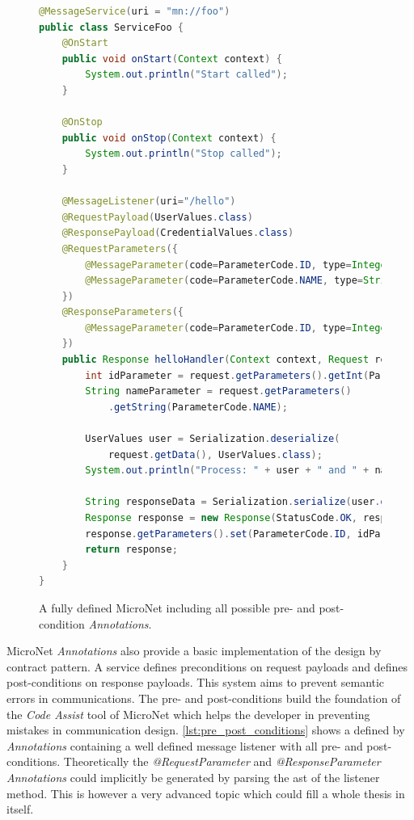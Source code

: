 \begin{figure}
\begin{lstlisting}[language=Java,firstnumber=1] 
@MessageService(uri = "mn://foo")
public class ServiceFoo {
	@OnStart
	public void onStart(Context context) {
		System.out.println("Start called");
	}
	
	@OnStop
	public void onStop(Context context) {
		System.out.println("Stop called");
	}
	
	@MessageListener(uri="/hello")
	@RequestPayload(UserValues.class) 
	@ResponsePayload(CredentialValues.class)
	@RequestParameters({
		@MessageParameter(code=ParameterCode.ID, type=Integer.class),
		@MessageParameter(code=ParameterCode.NAME, type=String.class)
	})
	@ResponseParameters({
		@MessageParameter(code=ParameterCode.ID, type=Integer.class),
	})
	public Response helloHandler(Context context, Request request) {
		int idParameter = request.getParameters().getInt(ParameterCode.ID);
		String nameParameter = request.getParameters()
			.getString(ParameterCode.NAME);
		
		UserValues user = Serialization.deserialize(
			request.getData(), UserValues.class);
		System.out.println("Process: " + user + " and " + nameParameter);

		String responseData = Serialization.serialize(user.getCredentials());
		Response response = new Response(StatusCode.OK, responseData);
		response.getParameters().set(ParameterCode.ID, idParameter);
		return response;
	}
}
\end{lstlisting}
\caption{A fully defined MicroNet \ms{} including all possible pre- and
post-condition \textit{Annotations}.}
\label{lst:pre_post_conditions}
\end{figure}

MicroNet \textit{Annotations} also provide a basic implementation of the design
by contract pattern. A service defines preconditions on request payloads and
defines post-conditions on response payloads. This system aims to prevent
semantic errors in communications. The pre- and post-conditions build the
foundation of the \textit{Code Assist} tool of MicroNet which helps the
developer in preventing mistakes in \ms{} communication design.
\autoref{lst:pre_post_conditions} shows a \ms{} defined by \textit{Annotations}
containing a well defined message listener with all pre- and post-conditions.
Theoretically the \textit{@RequestParameter} and \textit{@ResponseParameter}
\textit{Annotations} could implicitly be generated by parsing the \gls{ast} of
the listener method. This is however a very advanced topic which could fill a
whole thesis in itself.
 
